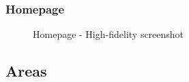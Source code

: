 \documentclass[11pt, letterpaper]{article}
\begin{document}
\subsubsection*{Homepage}
\begin{figure}[H]
    \centering
    \setlength{\fboxsep}{0pt}
    \caption{Homepage - High-fidelity screenshot}
    \label{fig:PageScreenshot_Homepage}
\end{figure}

\subsection{Areas}
\end{document}
